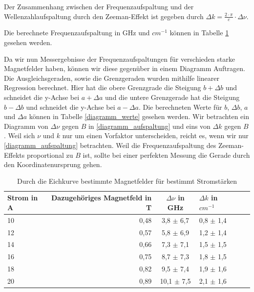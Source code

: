 \documentclass[10pt,a4paper]{article}
\begin{document}
Der Zusammenhang zwischen der Frequenzaufspaltung und der Wellenzahlaufspaltung durch den Zeeman-Effekt ist gegeben durch $\Delta k = \frac{2 \cdot \pi}{c} \cdot \Delta\nu$.

Die berechnete Frequenzaufspaltung in GHz und $cm^{-1}$ können in Tabelle \ref{gemessene_frequenzaufspaltungen} gesehen werden.

Da wir nun Messergebnisse der Frequenzaufspaltungen für verschieden starke Magnetfelder haben, können wir diese gegenüber in einem Diagramm Auftragen. Die Ausgleichsgeraden, sowie die Grenzgeraden wurden mithilfe linearer Regression berechnet. Hier hat die obere Grenzgrade die Steigung $b + \Delta b$ und schneidet die y-Achse bei $a + \Delta a$ und die untere Grenzgerade hat die Steigung $b - \Delta b$ und schneidet die y-Achse bei $a - \Delta a$. Die berechneten Werte für $b$, $\Delta b$, $a$ und $\Delta a$ können in Tabelle \ref{diagramm_werte} gesehen werden.
 Wir betrachten ein Diagramm von $\Delta\nu$ gegen $B$ in \ref{diagramm_aufspaltung} und eins von $\Delta k$ gegen $B$. Weil sich $\nu$ und $k$ nur um einen Vorfaktor unterscheiden, reicht es, wenn wir nur \ref{diagramm_aufspaltung} betrachten.
Weil die Frequenzaufspaltung des Zeeman-Effekts proportional zu $B$ ist, sollte bei einer perfekten Messung die Gerade durch den Koordinatenursprung gehen.

\begin{table}[h!]
	\centering
	\begin{tabular}{|l|r|c|lrp{16cm}}\hline
		Strom in A & Dazugehöriges Magnetfeld in T & $\Delta \nu$ in GHz & $\Delta k$ in $cm^{-1}$ \\\hline
		10 & 0,48 & 3,8 $\pm$ 6,7& 0,8 $\pm$ 1,4\\
		12 & 0,57 & 5,8  $\pm$ 6,9& 1,2 $\pm$ 1,4\\
		14 & 0,66 & 7,3 $\pm$ 7,1& 1,5 $\pm$ 1,5\\
		16 & 0,75 & 8,7 $\pm$ 7,3& 1,8 $\pm$ 1,5\\
		18 & 0,82 & 9,5 $\pm$ 7,4& 1,9 $\pm$ 1,6\\
		20 & 0,89 & 10,1 $\pm$ 7,5& 2,1 $\pm$ 1,6\\\hline
	\end{tabular}
	\caption{Durch die Eichkurve bestimmte Magnetfelder für bestimmt Stromstärken}
	\label{gemessene_frequenzaufspaltungen}
\end{table}
\end{document}
